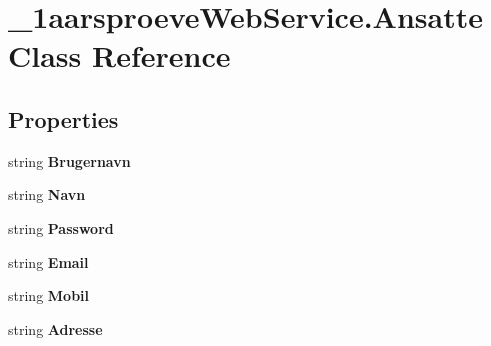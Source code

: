 \hypertarget{class__1aarsproeve_web_service_1_1_ansatte}{}\section{\+\_\+1aarsproeve\+Web\+Service.\+Ansatte Class Reference}
\label{class__1aarsproeve_web_service_1_1_ansatte}
\subsection*{Properties}
\begin{DoxyCompactItemize}
\item 
\hypertarget{class__1aarsproeve_web_service_1_1_ansatte_a266da49f2082cf1a36e5ffdb9d6619be}{}string {\bfseries Brugernavn}\label{class__1aarsproeve_web_service_1_1_ansatte_a266da49f2082cf1a36e5ffdb9d6619be}

\item 
\hypertarget{class__1aarsproeve_web_service_1_1_ansatte_ae2cdae5ed4bf100d864a4e8df1ead535}{}string {\bfseries Navn}\label{class__1aarsproeve_web_service_1_1_ansatte_ae2cdae5ed4bf100d864a4e8df1ead535}

\item 
\hypertarget{class__1aarsproeve_web_service_1_1_ansatte_aaa29d692377cdb4e95a2434d92e0ef74}{}string {\bfseries Password}\label{class__1aarsproeve_web_service_1_1_ansatte_aaa29d692377cdb4e95a2434d92e0ef74}

\item 
\hypertarget{class__1aarsproeve_web_service_1_1_ansatte_adcc5f7a69dbcfe145f01e68771b0d7f6}{}string {\bfseries Email}\label{class__1aarsproeve_web_service_1_1_ansatte_adcc5f7a69dbcfe145f01e68771b0d7f6}

\item 
\hypertarget{class__1aarsproeve_web_service_1_1_ansatte_a517535fd4683512adf0c47697582587d}{}string {\bfseries Mobil}\label{class__1aarsproeve_web_service_1_1_ansatte_a517535fd4683512adf0c47697582587d}

\item 
\hypertarget{class__1aarsproeve_web_service_1_1_ansatte_af8d84043c25ddab0dd07b521a25da7b8}{}string {\bfseries Adresse}\label{class__1aarsproeve_web_service_1_1_ansatte_af8d84043c25ddab0dd07b521a25da7b8}


\end{DoxyCompactItemize}
